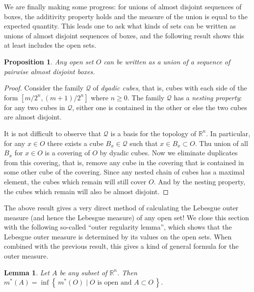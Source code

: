 \documentclass[10pt,oneside]{amsbook}
\newcommand{\set}[1]{\left\{\,#1\,\right\}}
\newcommand{\RR}{{\mathbb R}}
\theoremstyle{definition}
\theoremstyle{plain}
\newtheorem{lem}[thm]{Lemma}
\newtheorem{prop}[thm]{Proposition}
\theoremstyle{definition}
\theoremstyle{remark}
\numberwithin{equation}{section}
\numberwithin{figure}{section}
\begin{document}
We are finally making some progress: for unions of almost disjoint sequences of boxes, the additivity property holds and the measure of the union is equal to the expected quantity. This leads one to ask what kinds of sets can be written as unions of almost disjoint sequences of boxes, and the following result shows this at least includes the open sets.

\begin{prop}
  \label{prop:open-decomp}
  Any open set $O$ can be written as a union of a sequence of pairwise almost disjoint boxes.
\end{prop}

\begin{proof}
  Consider the family $\mathcal Q$ of \emph{dyadic cubes}, that is, cubes with each side of the form $[m/2^n,(m+1)/2^n]$ where $n\geq0$. The family $\mathcal Q$ has a \emph{nesting property}: for any two cubes in $\mathcal Q$, either one is contained in the other or else the two cubes are almost disjoint.

  It is not difficult to observe that $\mathcal Q$ is a basis for the topology of $\RR^n$. In particular, for any $x\in O$ there exists a cube $B_x\in\mathcal Q$ such that $x\in B_x\subset O$. Thu union of all $B_x$ for $x\in O$ is a covering of $O$ by dyadic cubes. Now we eliminate duplicates from this covering, that is, remove any cube in the covering that is contained in some other cube of the covering. Since any nested chain of cubes has a maximal element, the cubes which remain will still cover $O$. And by the nesting property, the cubes which remain will also be almost disjoint.
\end{proof}

The above result gives a very direct method of calculating the Lebesgue outer measure (and hence the Lebesgue measure) of any open set! We close this section with the following so-called ``outer regularity lemma'', which shows that the Lebesgue outer measure is determined by its values on the open sets. When combined with the previous result, this gives a kind of general formula for the outer measure.


\begin{lem}
  Let $A$ be any subset of $\RR^n$. Then $m^*(A)=\inf\set{m^*(O)\mid\text{$O$ is open and }A\subset O}$.
\end{lem}
\end{document}
